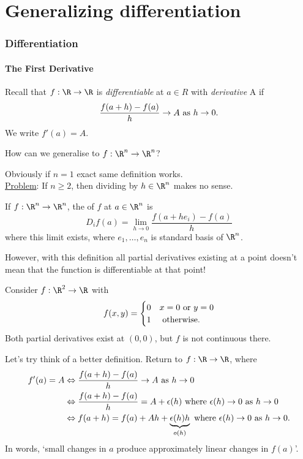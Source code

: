 \part{Generalizing differentiation}
\section{Differentiation}

\subsection{The First Derivative}
Recall that $f:\R\to \R$ is \emph{differentiable} at $a\in R$ with \emph{derivative} A if \[ \frac{f(a+h)-f(a)}{h}\to A \textup{ as } h\to 0.\] We write $f'(a) = A$.

\begin{question}
    How can we generalise to $f:\R^n\to \R^n$?
\end{question}
Obviously if $n = 1$ exact same definition works. \\
\underline{Problem}: If $n\geq 2$, then dividing by $h\in \R^n$ makes no sense.

\begin{definition}
    If $f: \R^n\to \R^n$, the  of $f$ at $a\in \R^n$ is \[ D_i f(a) = \lim_{h\to 0} \frac{f(a+he_i)-f(a)}{h}\]
    where this limit exists, where $e_1,\dots ,e_n$ is standard basis of $\R^n$.
\end{definition}

However, with this definition all partial derivatives existing at a point doesn't mean that the function is differentiable at that point!
\begin{example}
    Consider $f:\R^2\to \R$ with
    \[
    f(x,y) = \begin{cases}
    0 & x = 0 \textup{ or } y = 0\\
    1 & \textup{ otherwise.}
    \end{cases}
    \]
    Both partial derivatives exist at $(0,0)$, but $f$ is not continuous there.
\end{example}

Let's try think of a better definition. Return to $f:\R\to \R$, where
\begin{align*}
    f'(a) = A &\Leftrightarrow \frac{f(a+h) - f(a)}{h}\to A \textup{ as }h\to 0\\
    &\Leftrightarrow \frac{f(a+h) - f(a)}{h} = A+\epsilon(h) \textup{ where } \epsilon(h)\to 0 \textup{ as } h\to 0\\
    &\Leftrightarrow f(a+h) = f(a) + Ah + \underbrace{\epsilon(h)h}_{o(h)} \textup{ where } \epsilon(h)\to 0 \textup{ as } h\to 0.
\end{align*}
In words, `small changes in $a$ produce approximately linear changes in $f(a)$'.

